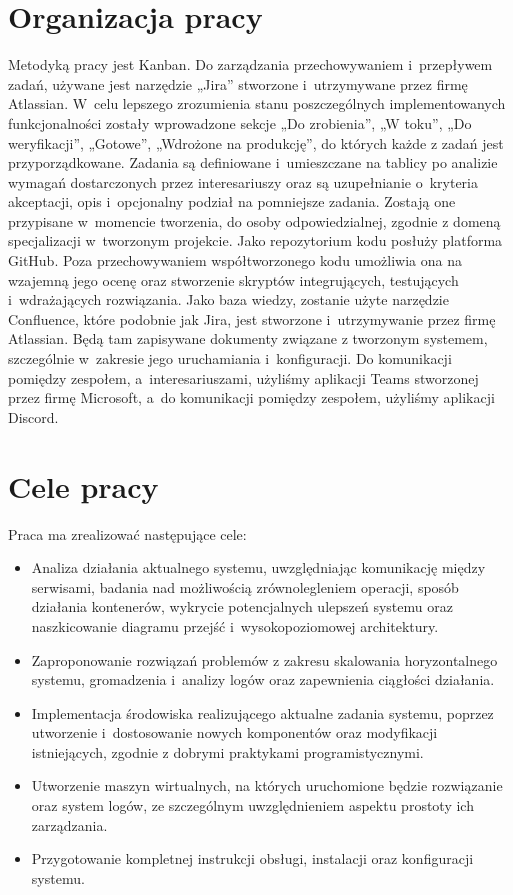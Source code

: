 \section{Organizacja pracy}
\indent Metodyką pracy jest Kanban. Do zarządzania przechowywaniem i~przepływem zadań, używane jest narzędzie „Jira” stworzone i~utrzymywane przez firmę Atlassian. W~celu lepszego zrozumienia stanu poszczególnych implementowanych funkcjonalności zostały wprowadzone sekcje „Do zrobienia”, „W toku”, „Do weryfikacji”, „Gotowe”, „Wdrożone na produkcję”, do których każde z zadań jest przyporządkowane. Zadania są definiowane i~umieszczane na tablicy po analizie wymagań dostarczonych przez interesariuszy oraz są uzupełnianie o~kryteria akceptacji, opis i~opcjonalny podział na pomniejsze zadania. Zostają one przypisane w~momencie tworzenia, do osoby odpowiedzialnej, zgodnie z domeną specjalizacji w~tworzonym projekcie.
\newline \indent Jako repozytorium kodu posłuży platforma GitHub. Poza przechowywaniem współtworzonego kodu umożliwia ona na wzajemną jego ocenę oraz stworzenie skryptów integrujących, testujących i~wdrażających rozwiązania.
\newline \indent Jako baza wiedzy, zostanie użyte narzędzie Confluence, które podobnie jak Jira, jest stworzone i~utrzymywanie przez firmę Atlassian. Będą tam zapisywane dokumenty związane z tworzonym systemem, szczególnie w~zakresie jego uruchamiania i~konfiguracji.
\newline \indent Do komunikacji pomiędzy zespołem, a~interesariuszami, użyliśmy aplikacji Teams stworzonej przez firmę Microsoft, a~do komunikacji pomiędzy zespołem, użyliśmy aplikacji Discord.

\section{Cele pracy}
\indent Praca ma zrealizować następujące cele:
\begin{itemize}
    \item Analiza działania aktualnego systemu, uwzględniając komunikację między serwisami, badania nad możliwością zrównolegleniem operacji, sposób działania kontenerów, wykrycie potencjalnych ulepszeń systemu oraz naszkicowanie diagramu przejść i~wysokopoziomowej architektury.
    \item Zaproponowanie rozwiązań problemów z zakresu skalowania horyzontalnego systemu, gromadzenia i~analizy logów oraz zapewnienia ciągłości działania.
    \item Implementacja środowiska realizującego aktualne zadania systemu, poprzez utworzenie i~dostosowanie nowych komponentów oraz modyfikacji istniejących, zgodnie z dobrymi praktykami programistycznymi.
    \item Utworzenie maszyn wirtualnych, na których uruchomione będzie rozwiązanie oraz system logów, ze szczególnym uwzględnieniem aspektu prostoty ich zarządzania.
    \item Przygotowanie kompletnej instrukcji obsługi, instalacji oraz konfiguracji systemu.
\end{itemize}
